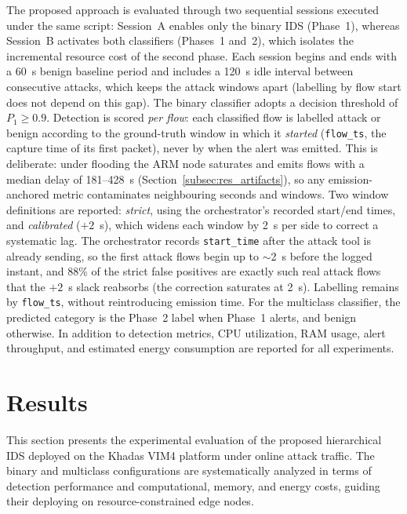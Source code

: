\documentclass[conference]{IEEEtran}
\begin{document}
The proposed approach is evaluated through two sequential sessions executed under the same script: Session~A enables only the binary IDS (Phase~1), whereas Session~B activates both classifiers (Phases~1 and~2), which isolates the incremental resource cost of the second phase. Each session begins and ends with a 60~s benign baseline period and includes a 120~s idle interval between consecutive attacks, which keeps the attack windows apart (labelling by flow start does not depend on this gap).
The binary classifier adopts a decision threshold of $P_1 \geq 0.9$. Detection is scored \emph{per flow}: each classified flow is labelled attack or benign according to the ground-truth window in which it \emph{started} (\texttt{flow\_ts}, the capture time of its first packet), never by when the alert was emitted. This is deliberate: under flooding the ARM node saturates and emits flows with a median delay of 181--428~s (Section~\ref{subsec:res_artifacts}), so any emission-anchored metric contaminates neighbouring seconds and windows. Two window definitions are reported: \emph{strict}, using the orchestrator's recorded start/end times, and \emph{calibrated} ($+2$~s), which widens each window by 2~s per side to correct a systematic lag. The orchestrator records \texttt{start\_time} after the attack tool is already sending, so the first attack flows begin up to $\sim$2~s before the logged instant, and 88\% of the strict false positives are exactly such real attack flows that the $+2$~s slack reabsorbs (the correction saturates at 2~s). Labelling remains by \texttt{flow\_ts}, without reintroducing emission time. For the multiclass classifier, the predicted category is the Phase~2 label when Phase~1 alerts, and benign otherwise. In addition to detection metrics, CPU utilization, RAM usage, alert throughput, and estimated energy consumption are reported for all experiments.

\section{Results}
\label{sec:results}

This section presents the experimental evaluation of the proposed hierarchical IDS deployed on the Khadas VIM4 platform under online attack traffic. The binary and multiclass configurations are systematically analyzed in terms of detection performance and computational, memory, and energy costs, guiding their deploying on resource-constrained edge nodes.
\end{document}

